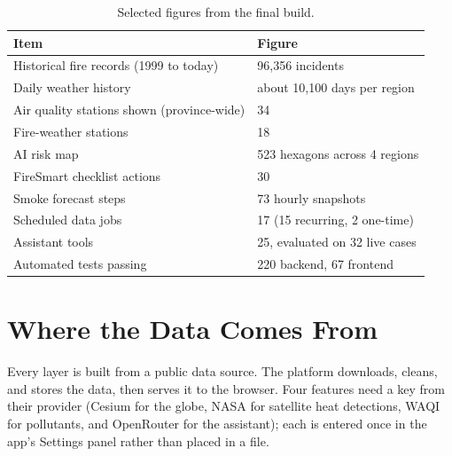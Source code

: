 \documentclass[11pt]{article}
\begin{document}
\begin{table}[h]
\centering
\small
\begin{tabular}{@{}L{6.5cm}L{6.5cm}@{}}
\toprule
\textbf{Item} & \textbf{Figure} \\
\midrule
Historical fire records (1999 to today) & 96,356 incidents \\
Daily weather history & about 10,100 days per region \\
Air quality stations shown (province-wide) & 34 \\
Fire-weather stations & 18 \\
AI risk map & 523 hexagons across 4 regions \\
FireSmart checklist actions & 30 \\
Smoke forecast steps & 73 hourly snapshots \\
Scheduled data jobs & 17 (15 recurring, 2 one-time) \\
Assistant tools & 25, evaluated on 32 live cases \\
Automated tests passing & 220 backend, 67 frontend \\
\bottomrule
\end{tabular}
\caption{Selected figures from the final build.}
\end{table}

\section{Where the Data Comes From}

Every layer is built from a public data source. The platform downloads,
cleans, and stores the data, then serves it to the browser. Four features need
a key from their provider (Cesium for the globe, NASA for satellite heat
detections, WAQI for pollutants, and OpenRouter for the assistant); each is
entered once in the app's Settings panel rather than placed in a file.
\end{document}
